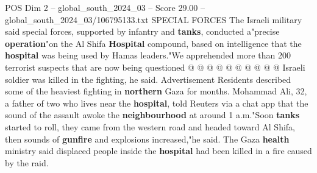 \begin{textsample}{POS Dim 2 – global\_south\_2024\_03 – Score 29.00 – global\_south\_2024\_03/106795133.txt}
SPECIAL FORCES The Israeli military said special forces, supported by infantry and \textbf{tanks}, conducted a"precise \textbf{operation}"on the Al Shifa \textbf{Hospital} compound, based on intelligence that the \textbf{hospital} was being used by Hamas leaders."We apprehended more than 200 terrorist suspects that are now being questioned @ @ @ @ @ @ @ @ @ @ Israeli soldier was killed in the fighting, he said.
Advertisement Residents described some of the heaviest fighting in \textbf{northern} Gaza for months.
Mohammad Ali, 32, a father of two who lives near the \textbf{hospital}, told Reuters via a chat app that the sound of the assault awoke the \textbf{neighbourhood} at around 1 a.m."Soon \textbf{tanks} started to roll, they came from the western road and headed toward Al Shifa, then sounds of \textbf{gunfire} and explosions increased,"he said.
The Gaza \textbf{health} ministry said displaced people inside the \textbf{hospital} had been killed in a fire caused by the raid.

\end{textsample}
